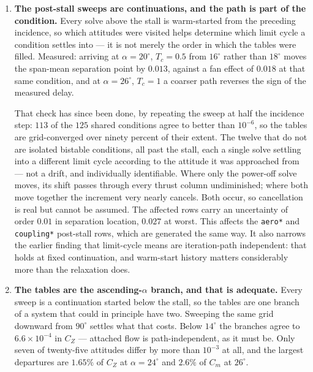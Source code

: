 \documentclass[11pt,a4paper]{article}
\newcommand{\varid}[1]{\texttt{\small #1}}
\newcommand{\dg}{^\circ}
\begin{document}
\begin{enumerate}
the ring's side-projected area, raising $C_{D_0}(90\dg)$ from $0.195$ to
$0.208$; what remains unmodelled is the interference between the body
wake and the wing, so \varid{aeroCD0} is still a lower bound at high
incidence, by less than before.
\item \textbf{The post-stall sweeps are continuations, and the path
is part of the condition.} Every solve above the stall is warm-started
from the preceding incidence, so which attitudes were visited helps
determine which limit cycle a condition settles into --- it is not merely
the order in which the tables were filled. Measured: arriving at
$\alpha = 20\dg$, $T_c = 0.5$ from $16\dg$ rather than $18\dg$ moves the
span-mean separation point by $0.013$, against a fan effect of $0.018$ at
that same condition, and at $\alpha = 26\dg$, $T_c = 1$ a coarser path
reverses the sign of the measured delay.

That check has since been done, by repeating the sweep at half the
incidence step: $113$ of the $125$ shared conditions agree to better than
$10^{-6}$, so the tables are grid-converged over ninety percent of their
extent. The twelve that do not are isolated bistable conditions, all past
the stall, each a single solve settling into a different limit cycle
according to the attitude it was approached from --- not a drift, and
individually identifiable. Where only the power-off solve moves, its shift
passes through every thrust column undiminished; where both move together
the increment very nearly cancels. Both occur, so cancellation is real but
cannot be assumed. The affected rows carry an uncertainty of order $0.01$
in separation location, $0.027$ at worst. This affects the \varid{aero*} and
\varid{coupling*} post-stall rows, which are generated the same way. It
also narrows the earlier finding that limit-cycle means are
iteration-path independent: that holds at fixed continuation, and
warm-start history matters considerably more than the relaxation does.

\item \textbf{The tables are the ascending-$\alpha$ branch, and that is
adequate.} Every sweep is a continuation started below the stall, so the
tables are one branch of a system that could in principle have two.
Sweeping the same grid downward from $90\dg$ settles what that costs.
Below $14\dg$ the branches agree to $6.6\times10^{-4}$ in $C_Z$ ---
attached flow is path-independent, as it must be. Only seven of
twenty-five attitudes differ by more than $10^{-3}$ at all, and the
largest departures are $1.65\%$ of $C_Z$ at $\alpha = 24\dg$ and $2.6\%$
of $C_m$ at $26\dg$.


\end{enumerate}
\end{document}
